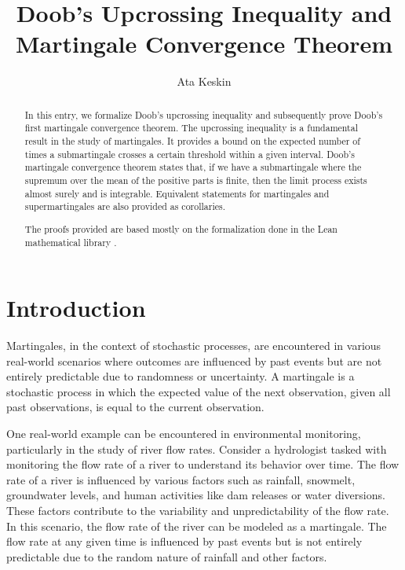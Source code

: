 \documentclass[11pt,a4paper]{article}
\begin{document}
\title{Doob's Upcrossing Inequality and Martingale Convergence Theorem}
\author{Ata Keskin}
\maketitle

\begin{abstract}
In this entry, we formalize Doob's upcrossing inequality and subsequently prove Doob's first martingale convergence theorem. The upcrossing inequality is a fundamental result in the study of martingales. It provides a bound on the expected number of times a submartingale crosses a certain threshold within a given interval. Doob's martingale convergence theorem states that, if we have a submartingale where the supremum over the mean of the positive parts is finite, then the limit process exists almost surely and is integrable. Equivalent statements for martingales and supermartingales are also provided as corollaries.

The proofs provided are based mostly on the formalization done in the Lean mathematical library \cite{ying2022formalization,Degenne_Ying_2022}.

\end{abstract}

\tableofcontents
\pagebreak

\section{Introduction}

Martingales, in the context of stochastic processes, are encountered in various real-world scenarios where outcomes are influenced by past events but are not entirely predictable due to randomness or uncertainty. A martingale is a stochastic process in which the expected value of the next observation, given all past observations, is equal to the current observation.

One real-world example can be encountered in environmental monitoring, particularly in the study of river flow rates. Consider a hydrologist tasked with monitoring the flow rate of a river to understand its behavior over time. The flow rate of a river is influenced by various factors such as rainfall, snowmelt, groundwater levels, and human activities like dam releases or water diversions. These factors contribute to the variability and unpredictability of the flow rate. In this scenario, the flow rate of the river can be modeled as a martingale. The flow rate at any given time is influenced by past events but is not entirely predictable due to the random nature of rainfall and other factors.
\end{document}
